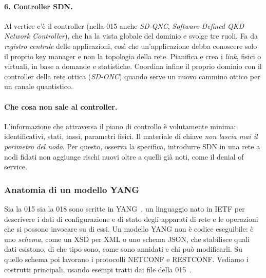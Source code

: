 \paragraph{6. Controller SDN.}
Al vertice c'è il controller (nella 015 anche \emph{SD-QNC},
\emph{Software-Defined QKD Network Controller}), che ha la vista globale del
dominio e svolge tre ruoli. Fa da \emph{registro centrale} delle
applicazioni, così che un'applicazione debba conoscere solo il proprio key
manager e non la topologia della rete. Pianifica e crea i \emph{link},
fisici o virtuali, in base a domande e statistiche. Coordina infine il
proprio dominio con il controller della rete ottica (\emph{SD-ONC}) quando
serve un nuovo cammino ottico per un canale quantistico.

\paragraph{Che cosa non sale al controller.}
L'informazione che attraversa il piano di controllo è volutamente minima:
identificativi, stati, tassi, parametri fisici. Il materiale di chiave
\emph{non lascia mai il perimetro del nodo}. Per questo, osserva la
specifica, introdurre SDN in una rete a nodi fidati non aggiunge rischi
nuovi oltre a quelli già noti, come il denial of service.

\subsubsection{Anatomia di un modello YANG}
\label{sec:yang-anatomia}

Sia la 015 sia la 018 sono scritte in YANG~\cite{rfc7950}, un linguaggio
nato in IETF per descrivere i dati di configurazione e di stato degli
apparati di rete e le operazioni che si possono invocare su di essi. Un
modello YANG non è codice eseguibile: è uno \emph{schema}, come un XSD per
XML o uno schema JSON, che stabilisce quali dati esistono, di che tipo sono,
come sono annidati e chi può modificarli. Su quello schema poi lavorano i
protocolli NETCONF e RESTCONF. Vediamo i costrutti principali, usando
esempi tratti dai file della 015~\cite{qkd015yang}.

